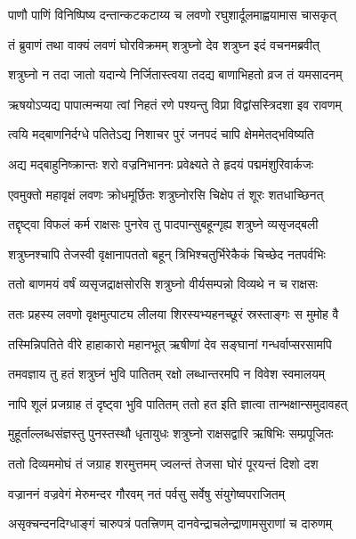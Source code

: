 \twolineshloka
{पाणौ पाणिं विनिष्पिष्य दन्तान्कटकटाय्य च}
{लवणो रघुशार्दूलमाह्वयामास चासकृत्} %

\twolineshloka
{तं ब्रुवाणं तथा वाक्यं लवणं घोरविक्रमम्}
{शत्रुघ्नो देव शत्रुघ्न इदं वचनमब्रवीत्} %

\twolineshloka
{शत्रुघ्नो न तदा जातो यदान्ये निर्जितास्त्वया}
{तदद्य बाणाभिहतो व्रज तं यमसादनम्} %

\twolineshloka
{ऋषयोऽप्यद्य पापात्मन्मया त्वां निहतं रणे}
{पश्यन्तु विप्रा विद्वांसस्त्रिदशा इव रावणम्} %

\twolineshloka
{त्वयि मद्बाणनिर्दग्धे पतितेऽद्य निशाचर}
{पुरं जनपदं चापि क्षेममेतद्भविष्यति} %

\twolineshloka
{अद्य मद्बाहुनिष्क्रान्तः शरो वज्रनिभाननः}
{प्रवेक्ष्यते ते हृदयं पद्ममंशुरिवार्कजः} %

\twolineshloka
{एवमुक्तो महावृक्षं लवणः क्रोधमूर्छितः}
{शत्रुघ्नोरसि चिक्षेप तं शूरः शतधाच्छिनत्} %

\twolineshloka
{तद्दृष्ट्वा विफलं कर्म राक्षसः पुनरेव तु}
{पादपान्सुबहून्गृह्य शत्रुघ्ने व्यसृजद्बली} %

\twolineshloka
{शत्रुघ्नश्चापि तेजस्वी वृक्षानापततो बहून्}
{त्रिभिश्चतुर्भिरेकैकं चिच्छेद नतपर्वभिः} %

\twolineshloka
{ततो बाणमयं वर्षं व्यसृजद्राक्षसोरसि}
{शत्रुघ्नो वीर्यसम्पन्नो विव्यथे न च राक्षसः} %

\twolineshloka
{ततः प्रहस्य लवणो वृक्षमुत्पाट्य लीलया}
{शिरस्यभ्यहनच्छूरं स्रस्ताङ्गः स मुमोह वै} %

\twolineshloka
{तस्मिन्निपतिते वीरे हाहाकारो महानभूत्}
{ऋषीणां देव सङ्घानां गन्धर्वाप्सरसामपि} %

\twolineshloka
{तमवज्ञाय तु हतं शत्रुघ्नं भुवि पातितम्}
{रक्षो लब्धान्तरमपि न विवेश स्वमालयम्} %

\twolineshloka
{नापि शूलं प्रजग्राह तं दृष्ट्वा भुवि पातितम्}
{ततो हत इति ज्ञात्वा तान्भक्षान्समुदावहत्} %

\twolineshloka
{मुहूर्ताल्लब्धसंज्ञस्तु पुनस्तस्थौ धृतायुधः}
{शत्रुघ्नो राक्षसद्वारि ऋषिभिः सम्प्रपूजितः} %

\twolineshloka
{ततो दिव्यममोघं तं जग्राह शरमुत्तमम्}
{ज्वलन्तं तेजसा घोरं पूरयन्तं दिशो दश} %

\twolineshloka
{वज्राननं वज्रवेगं मेरुमन्दर गौरवम्}
{नतं पर्वसु सर्वेषु संयुगेष्वपराजितम्} %

\twolineshloka
{असृक्चन्दनदिग्धाङ्गं चारुपत्रं पतत्त्रिणम्}
{दानवेन्द्राचलेन्द्राणामसुराणां च दारुणम्} %

